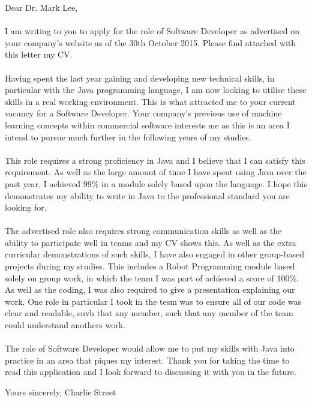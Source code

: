\documentclass[12pt]{article}
\begin{document}
	\begin{flushleft}
		Dear Dr. Mark Lee, 
		\paragraph{}
			I am writing to you to apply for the role of Software Developer as advertised on your company's website as of the 30th October 2015. Please find attached with this letter my CV.
	
		\paragraph{}
			Having spent the last year gaining and developing new technical skills, in particular with the Java programming language, I am now looking to utilise these skills in a real working environment. This is what attracted me to your current vacancy for a Software Developer. Your company's previous use of machine learning concepts within commercial software interests me as this is an area I intend to pursue much further in the following years of my studies.

		\paragraph{}
			This role requires a strong proficiency in Java and I believe that I can satisfy this requirement. As well as the large amount of time I have spent using Java over the past year, I achieved 99\% in a module solely based upon the language. I hope this demonstrates my ability to write in Java to the professional standard you are looking for.

		\paragraph{}
			The advertised role also requires strong communication skills as well as the ability to participate well in teams and my CV shows this. As well as the extra curricular demonstrations of such skills, I have also engaged in other group-based projects during my studies. This includes a Robot Programming module based solely on group work, in which the team I was part of achieved a score of 100\%. As well as the coding, I was also required to give a presentation explaining our work. One role in particular I took in the tesm was to ensure all of our code was clear and readable, suvh that any member, such that any member of the team could understand anothers work.

		\paragraph{}
			The role of Software Developer would allow me to put my skills with Java into practice in an area that piques my interest. Thank you for taking the time to read this application and I look forward to discussing it with you in the future.\\

		
	\end{flushleft}

	\begin{flushleft}
		Yours sincerely,
		\newline
		\break
		Charlie Street
	\end{flushleft}
\end{document}
